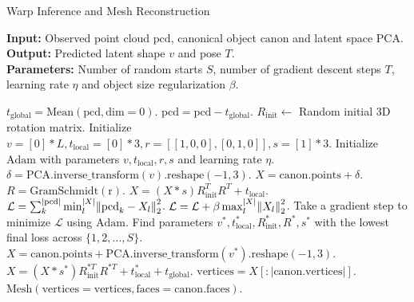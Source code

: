 \documentclass{article}
\begin{document}
\begin{algorithm}[H]

\caption{Warp Inference and Mesh Reconstruction}\label{alg:warp_infer} 

\begin{flushleft}
    \hspace*{\algorithmicindent} \textbf{Input:} Observed point cloud $\mathrm{pcd}$, canonical object $\mathrm{canon}$ and latent space $\mathrm{PCA}$. \\
    \hspace*{\algorithmicindent} \textbf{Output:} Predicted latent shape $v$ and pose $T$. \\
    \hspace*{\algorithmicindent} \textbf{Parameters:} Number of random starts $S$, number of gradient descent steps $T$, learning rate $\eta$ and object size regularization $\beta$.
\end{flushleft}

\begin{algorithmic}[1]

    \State $t_{\mathrm{global}} = \mathrm{Mean}(\mathrm{pcd}, \mathrm{dim}=0)$.
    \State $\mathrm{pcd} = \mathrm{pcd} - t_{\mathrm{global}}$. \Comment{\textcolor{blue}{Center the point cloud.}}
        \State $R_{\mathrm{init}} \leftarrow$ Random initial 3D rotation matrix.
        \State Initialize $v = [0]*L, t_{\mathrm{local}} = [0]*3, r = [[1, 0, 0], [0, 1, 0]], s = [1]*3$.
        \State Initialize $\mathrm{Adam}$ \cite{kingma15adam} with parameters $v, t_{\mathrm{local}}, r, s$ and learning rate $\eta$.
            \State $\delta = \mathrm{PCA.inverse\_transform}(v)\mathrm{.reshape(-1, 3)}$.
            \State $X = \mathrm{canon.points} + \delta$. \Comment{\textcolor{blue}{Warped canonical point cloud.}}
            \State $R = \mathrm{GramSchmidt(r)}$.
            \State $X = (X * s) R_{\mathrm{init}}^T R^T + t_{\mathrm{local}}$. \Comment{\textcolor{blue}{Scaled, rotated and translated point cloud.}}
            \State $\mathcal{L} = \sum_k^{|\mathrm{pcd}|} \min_l^{|X|} \norm{\mathrm{pcd}_k - X_l}_2^2$. \Comment{\textcolor{blue}{One-sided Chamfer distance.}}
            \State $\mathcal{L} = \mathcal{L} + \beta \max_l^{|X|} \norm{X_l}_2^2$. \Comment{\textcolor{blue}{Object size regularization.}}
            \State Take a gradient step to minimize $\mathcal{L}$ using $\mathrm{Adam}$.
        \EndFor
    \EndFor
    \State Find parameters $v^*, t^*_{\mathrm{local}}, R_{\mathrm{init}}^*, R^*, s^*$ with the lowest final loss across $\{ 1, 2, ..., S \}$.
    \State $X = \mathrm{canon.points} +\mathrm{PCA.inverse\_transform}(v^*)\mathrm{.reshape(-1, 3)}$.
    \State $X = (X * s^*) R_{\mathrm{init}}^{*T} R^{*T} + t^*_{\mathrm{local}} + t_{\mathrm{global}}$. \Comment{\textcolor{blue}{Complete point cloud in workspace coordinates.}}
    \State $\mathrm{vertices} = X[:|\mathrm{canon.vertices}|]$. 
    \State \Return $\mathrm{Mesh}(\mathrm{vertices} = \mathrm{vertices}, \mathrm{faces} = \mathrm{canon.faces})$. \Comment{\textcolor{blue}{Warped mesh.}}


\end{algorithmic}
\end{algorithm}
\end{document}
